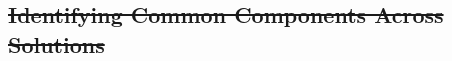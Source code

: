 \documentclass[12pt,twoside]{mitthesis}
\providecommand{\DIFdeltex}[1]{{\protect\color{red}\sout{#1}}}                      %
\providecommand{\DIFdelbegin}{} %
\providecommand{\DIFdelend}{} %
\providecommand{\DIFdel}[1]{\texorpdfstring{\DIFdeltex{#1}}{}} %
\begin{document}
{{{{{{{{{{%

\DIFdelbegin %
\DIFdelend %


\DIFdelbegin %
\DIFdelend %


\DIFdelbegin %
\DIFdelend %

\DIFdelbegin \subsection{\DIFdel{Identifying Common Components Across Solutions}}
\addtocounter{subsection}{-1}%
\DIFdelend %

}}}}}}}}}}
\end{document}
